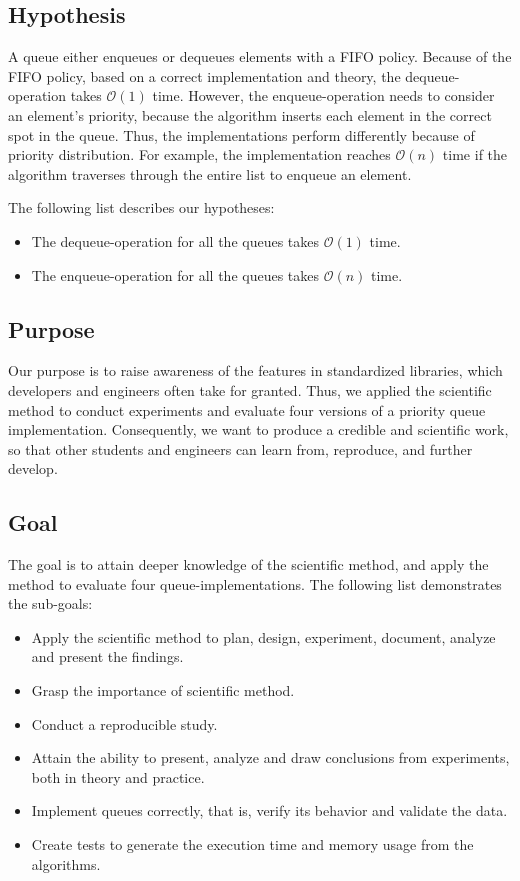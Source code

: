 \documentclass[a4paper,11pt]{kth-mag}
\newcommand*{\skippara}{\par\vspace{\baselineskip} \noindent}
\begin{document}
\subsection{Hypothesis}
A queue either enqueues or dequeues elements with a FIFO policy.
Because of the FIFO policy, based on a correct implementation and theory, the dequeue-operation takes $\mathcal{O}(1)$ time.
However, the enqueue-operation needs to consider an element's priority, because the algorithm inserts each element in the correct spot in the queue.
Thus, the implementations perform differently because of priority distribution.
For example, the implementation reaches $\mathcal{O}(n)$ time if the algorithm traverses through the entire list to enqueue an element.

\skippara The following list describes our hypotheses:
\begin{itemize}
    \item The dequeue-operation for all the queues takes $\mathcal{O}(1)$ time.
    \item The enqueue-operation for all the queues takes $\mathcal{O}(n)$ time.
\end{itemize}

\subsection{Purpose}\label{sec:purpose}
Our purpose is to raise awareness of the features in standardized libraries, which developers and engineers often take for granted.
Thus, we applied the scientific method to conduct experiments and evaluate four versions of a priority queue implementation.
Consequently, we want to produce a credible and scientific work, so that other students and engineers can learn from, reproduce, and further develop.

\subsection{Goal}\label{sec:goal}
The goal is to attain deeper knowledge of the scientific method, and apply the method to evaluate four queue-implementations.
The following list demonstrates the sub-goals:
\begin{itemize}
    \item Apply the scientific method to plan, design, experiment, document, analyze and present the findings.
    \item Grasp the importance of scientific method.
    \item Conduct a reproducible study.
    \item Attain the ability to present, analyze and draw conclusions from experiments, both in theory and practice.
    \item Implement queues correctly, that is, verify its behavior and validate the data.
    \item Create tests to generate the execution time and memory usage from the algorithms.
\end{itemize}
\end{document}
